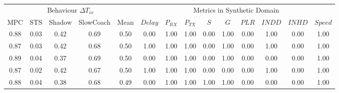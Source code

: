 \begin{tabular}{|*{5}{c|}|*{9}{c|}}
\toprule
\multicolumn{5}{|c||}{Behaviour $\Delta T_{ix}$} & \multicolumn{9}{c|}{Metrics in Synthetic Domain}\\
               MPC &  STS & Shadow & SlowCoach & Mean &                     $Delay$ & $P_{RX}$ & $P_{TX}$ &  $S$ &  $G$ & $PLR$ & $INDD$ & $INHD$ & $Speed$ \\
\midrule
              0.88 & 0.03 &   0.42 &      0.69 & 0.50 &                        0.00 &     1.00 &     1.00 & 0.00 & 1.00 &  0.00 &   1.00 &   0.00 &    1.00 \\
              0.87 & 0.03 &   0.42 &      0.68 & 0.50 &                        1.00 &     1.00 &     1.00 & 0.00 & 1.00 &  0.00 &   1.00 &   0.00 &    1.00 \\
              0.89 & 0.04 &   0.37 &      0.69 & 0.50 &                        0.00 &     1.00 &     1.00 & 0.00 & 1.00 &  0.00 &   0.00 &   0.00 &    1.00 \\
              0.87 & 0.02 &   0.42 &      0.67 & 0.50 &                        1.00 &     1.00 &     1.00 & 0.00 & 0.00 &  0.00 &   1.00 &   0.00 &    1.00 \\
              0.88 & 0.04 &   0.38 &      0.68 & 0.49 &                        0.00 &     1.00 &     1.00 & 1.00 & 1.00 &  0.00 &   0.00 &   0.00 &    1.00 \\
\bottomrule
\end{tabular}
